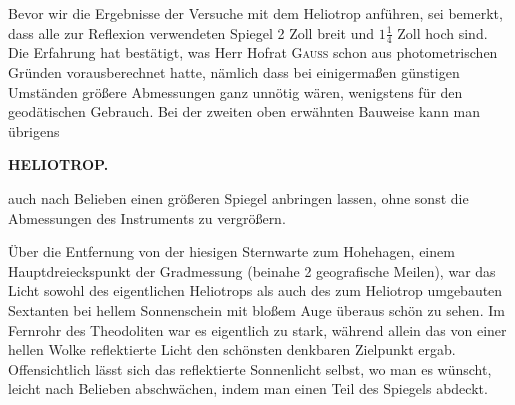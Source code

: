 \par\noindent\hspace*{\parindent}Bevor wir die Ergebnisse der Versuche mit dem Heliotrop anführen, sei bemerkt, dass alle zur Reflexion verwendeten Spiegel 2 Zoll breit und $1\frac14$ Zoll hoch sind. Die Erfahrung hat bestätigt, was Herr Hofrat \textsc{Gauss} schon aus photometrischen Gründen vorausberechnet hatte, nämlich dass bei einigermaßen günstigen Umständen größere Abmessungen ganz unnötig wären, wenigstens für den geodätischen Gebrauch. Bei der zweiten oben erwähnten Bauweise kann man übrigens
\par\clearpage
\noindent{}\hfill{\small\textbf{HELIOTROP.}}\hfill\null\par\medskip
\noindent auch nach Belieben einen größeren Spiegel anbringen lassen, ohne sonst die Abmessungen des Instruments zu vergrößern.
\begin{center}
\end{center}
\par\noindent\hspace*{\parindent}Über die Entfernung von der hiesigen Sternwarte zum Hohehagen, einem Hauptdreieckspunkt der Gradmessung (beinahe 2 geografische Meilen), war das Licht sowohl des eigentlichen Heliotrops als auch des zum Heliotrop umgebauten Sextanten bei hellem Sonnenschein mit bloßem Auge überaus schön zu sehen. Im Fernrohr des Theodoliten war es eigentlich zu stark, während allein das von einer hellen Wolke reflektierte Licht den schönsten denkbaren Zielpunkt ergab. Offensichtlich lässt sich das reflektierte Sonnenlicht selbst, wo man es wünscht, leicht nach Belieben abschwächen, indem man einen Teil des Spiegels abdeckt.

